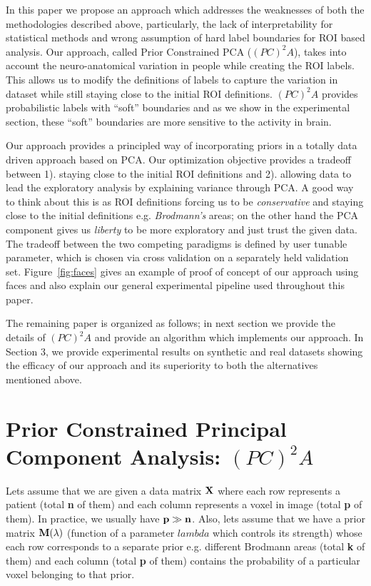 \documentclass{llncs}
\begin{document}
In this paper we propose an approach which addresses the weaknesses of both the methodologies described above, particularly, the lack of interpretability for statistical methods and wrong assumption of hard label boundaries for ROI based analysis. Our approach, called Prior Constrained PCA ($(PC)^2A$),  takes into account the neuro-anatomical variation in people while creating the ROI labels. This allows us to modify the definitions of labels to capture the variation in dataset while still staying close to the initial ROI definitions. $(PC)^2A$ provides probabilistic labels with ``soft'' boundaries and as we show in the experimental section, these ``soft'' boundaries are more sensitive to the activity in brain.

Our approach provides a principled way of incorporating priors in a totally data driven approach based on PCA. Our optimization objective provides a tradeoff between 1). staying close to the initial ROI definitions and 2). allowing data to lead the exploratory analysis by explaining variance through PCA. A good way to think about this is as ROI definitions forcing us to be {\em conservative} and staying close to the initial definitions e.g. {\it Brodmann's} areas; on the other hand the PCA component gives us {\em liberty} to be more exploratory and just trust the given data. The tradeoff between the two competing paradigms is defined by user tunable parameter, which is chosen via cross validation on a separately held validation set. Figure~\ref{fig:faces} gives an example of proof of concept of our approach using faces and also explain our general experimental pipeline used throughout this paper.


The remaining paper is organized as follows; in next section we provide the details of $(PC)^2A$ and provide an algorithm which implements our approach. In Section 3, we provide experimental results on synthetic and real datasets showing the efficacy of our approach and its superiority to both the alternatives mentioned above.


\section{ Prior Constrained Principal Component Analysis: $(PC)^2A$}
Lets assume that we are given a data matrix ${\bf X}$ where each row represents a patient (total {\bf n} of them) and each column represents a voxel in image (total {\bf p} of them). In practice, we usually have ${\bf p \gg n}$. Also, lets assume that we have a prior matrix {$\bf M(\lambda)$} (function of a parameter $lambda$ which controls its strength) whose each row corresponds to a separate prior e.g. different Brodmann areas (total {\bf k} of them) and each column (total {\bf p} of them) contains the probability of a particular voxel belonging to that prior.  
\end{document}
